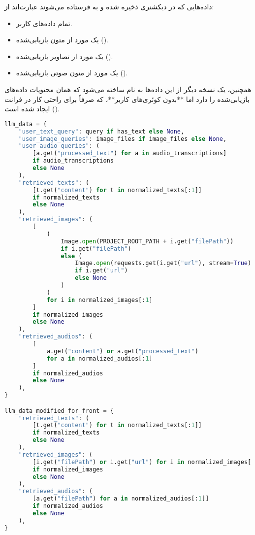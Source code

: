 \documentclass{article}
\begin{document}
داده‌هایی که در دیکشنری  ذخیره شده و به  فرستاده می‌شوند عبارت‌اند از:
\begin{itemize}
    \item تمام داده‌های کاربر.
    \item یک مورد از متون بازیابی‌شده ().
    \item یک مورد از تصاویر بازیابی‌شده ().
    \item یک مورد از متون صوتی بازیابی‌شده ().
\end{itemize}

همچنین، یک نسخه دیگر از این داده‌ها به نام  ساخته می‌شود که همان محتویات داده‌های بازیابی‌شده را دارد اما **بدون کوئری‌های کاربر**، که صرفاً برای راحتی کار در فرانت () ایجاد شده است.

\begin{latin}
\begin{lstlisting}[language=Python]
llm_data = {
    "user_text_query": query if has_text else None,
    "user_image_queries": image_files if image_files else None,
    "user_audio_queries": (
        [a.get("processed_text") for a in audio_transcriptions]
        if audio_transcriptions
        else None
    ),
    "retrieved_texts": (
        [t.get("content") for t in normalized_texts[:1]]
        if normalized_texts
        else None
    ),
    "retrieved_images": (
        [
            (
                Image.open(PROJECT_ROOT_PATH + i.get("filePath"))
                if i.get("filePath")
                else (
                    Image.open(requests.get(i.get("url"), stream=True).raw)
                    if i.get("url")
                    else None
                )
            )
            for i in normalized_images[:1]
        ]
        if normalized_images
        else None
    ),
    "retrieved_audios": (
        [
            a.get("content") or a.get("processed_text")
            for a in normalized_audios[:1]
        ]
        if normalized_audios
        else None
    ),
}

llm_data_modified_for_front = {
    "retrieved_texts": (
        [t.get("content") for t in normalized_texts[:1]]
        if normalized_texts
        else None
    ),
    "retrieved_images": (
        [i.get("filePath") or i.get("url") for i in normalized_images[:1]]
        if normalized_images
        else None
    ),
    "retrieved_audios": (
        [a.get("filePath") for a in normalized_audios[:1]]
        if normalized_audios
        else None
    ),
}
\end{lstlisting}
\end{latin}
\end{document}
